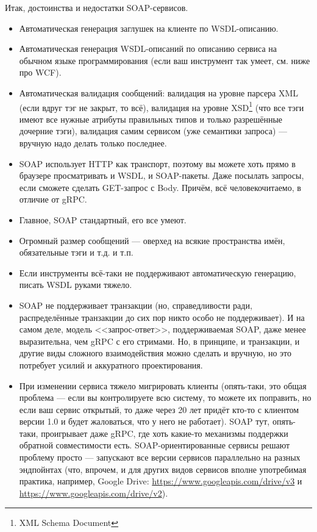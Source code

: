 \documentclass{../../text-style}
\begin{document}
Итак, достоинства и недостатки SOAP-сервисов.

\begin{itemize}
    \item[+] Автоматическая генерация заглушек на клиенте по WSDL-описанию.
    \item[+] Автоматическая генерация WSDL-описаний по описанию сервиса на обычном языке программирования (если ваш инструмент так умеет, см. ниже про WCF).
    \item[+] Автоматическая валидация сообщений: валидация на уровне парсера XML (если вдруг тэг не закрыт, то всё), валидация на уровне XSD\footnote{XML Schema Document} (что все тэги имеют все нужные атрибуты правильных типов и только разрешённые дочерние тэги), валидация самим сервисом (уже семантики запроса) --- вручную надо делать только последнее.
    \item[+] SOAP использует HTTP как транспорт, поэтому вы можете хоть прямо в браузере просматривать и WSDL, и SOAP-пакеты. Даже посылать запросы, если сможете сделать GET-запрос с Body. Причём, всё человекочитаемо, в отличие от gRPC.
    \item[+] Главное, SOAP стандартный, его все умеют.
    \item[-] Огромный размер сообщений --- оверхед  на всякие пространства имён, обязательные тэги и т.д. и т.п.
    \item[-] Если инструменты всё-таки не поддерживают автоматическую генерацию, писать WSDL руками тяжело.
    \item[-] SOAP не поддерживает транзакции (но, справедливости ради, распределённые транзакции до сих пор никто особо не поддерживает). И на самом деле, модель <<запрос-ответ>>, поддерживаемая SOAP, даже менее выразительна, чем gRPC с его стримами. Но, в принципе, и транзакции, и другие виды сложного взаимодействия можно сделать и вручную, но это потребует усилий и аккуратного проектирования.
    \item[-] При изменении сервиса тяжело мигрировать клиенты (опять-таки, это общая проблема --- если вы контролируете всю систему, то можете их поправить, но если ваш сервис открытый, то даже через 20 лет придёт кто-то с клиентом версии 1.0 и будет жаловаться, что у него не работает). SOAP тут, опять-таки, проигрывает даже gRPC, где хоть какие-то механизмы поддержки обратной совместимости есть. SOAP-ориентированные сервисы решают проблему просто --- запускают все версии сервисов параллельно на разных эндпойнтах (что, впрочем, и для других видов сервисов вполне употребимая практика, например, Google Drive: \url{https://www.googleapis.com/drive/v3} и \url{https://www.googleapis.com/drive/v2}).
\end{itemize}
\end{document}
